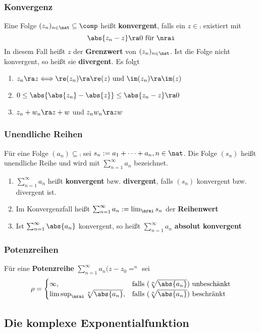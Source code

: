 \documentclass{kit}
\begin{document}
    \subsubsection{Konvergenz}
      Eine Folge $(z_n)_{n\in\nat}\subseteq\comp$ heißt \textbf{konvergent}, falls ein $z\in\comp$ existiert mit
      $$\abs{z_n-z}\ra0\text{ für }\nrai$$
      In diesem Fall heißt $z$ der \textbf{Grenzwert} von $(z_n)_{n\in\nat}$. Ist die Folge nicht konvergent, so heißt sie
      \textbf{divergent}. Es folgt \begin{enumerate}
        \item $z_n\ra z\Longleftrightarrow\re(z_n)\ra\re(z)\text{ und }\im(z_n)\ra\im(z)$
        \item $0\le\abs{\abs{z_n}-\abs{z}}\le\abs{z_n-z}\ra0$
        \item $z_n+w_n\ra z+w$ und $z_nw_n\ra zw$
      \end{enumerate}
    \subsubsection{Unendliche Reihen}
      Für eine Folge $(a_n)\subseteq\comp$ sei $s_n:=a_1+\dots+a_n,n\in\nat$. Die Folge $(s_n)$ heißt unendliche Reihe und
      wird mit $\sum^\infty_{n=1}a_n$ bezeichnet.
      \begin{enumerate}
        \item $\sum^\infty_{n=1}a_n$ heißt \textbf{konvergent} bzw. \textbf{divergent}, falls $(s_n)$ konvergent bzw. 
          divergent ist.
        \item Im Konvergenzfall heißt $\sum^\infty_{n=1}a_n:=\lim_\nrai s_n$ der \textbf{Reihenwert}
        \item Ist $\sum^\infty_{n=1}\abs{a_n}$ konvergent, so heißt $\sum^\infty_{n=1}a_n$ \textbf{absolut konvergent}
      \end{enumerate}
    \subsubsection{Potenzreihen}
      Für eine \textbf{Potenzreihe} $\sum^\infty_{n=1}a_n(z-z_0=^n$ sei
      $$\rho=\begin{cases}
        \infty, & \text{falls }(\sqrt[n]{\abs{a_n}})\text{ unbeschänkt}\\
        \limsup_\nrai\sqrt[n]{\abs{a_n}}, & \text{falls }(\sqrt[n]{\abs{a_n}})\text{ beschränkt}
      \end{cases}$$
  \subsection{Die komplexe Exponentialfunktion}
\end{document}
